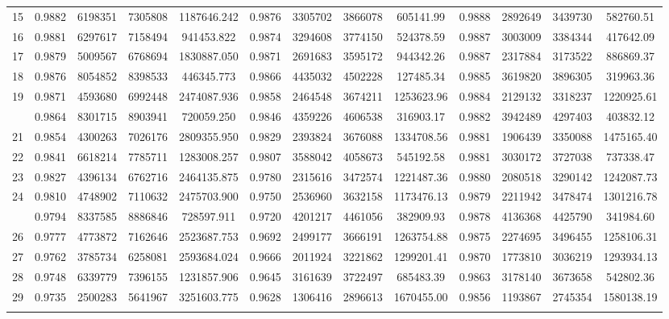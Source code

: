 \documentclass[
  12pt,
]{article}
\begin{document}
\begin{longtable}[t]{lcccccccccccc}
15 & 0.9882 & 6198351 & 7305808 & 1187646.242 & 0.9876 & 3305702 & 3866078 & 605141.99 & 0.9888 & 2892649 & 3439730 & 582760.51\\
16 & 0.9881 & 6297617 & 7158494 & 941453.822 & 0.9874 & 3294608 & 3774150 & 524378.59 & 0.9887 & 3003009 & 3384344 & 417642.09\\
17 & 0.9879 & 5009567 & 6768694 & 1830887.050 & 0.9871 & 2691683 & 3595172 & 944342.26 & 0.9887 & 2317884 & 3173522 & 886869.37\\
18 & 0.9876 & 8054852 & 8398533 & 446345.773 & 0.9866 & 4435032 & 4502228 & 127485.34 & 0.9885 & 3619820 & 3896305 & 319963.36\\
19 & 0.9871 & 4593680 & 6992448 & 2474087.936 & 0.9858 & 2464548 & 3674211 & 1253623.96 & 0.9884 & 2129132 & 3318237 & 1220925.61\\
\addlinespace
20 & 0.9864 & 8301715 & 8903941 & 720059.250 & 0.9846 & 4359226 & 4606538 & 316903.17 & 0.9882 & 3942489 & 4297403 & 403832.12\\
21 & 0.9854 & 4300263 & 7026176 & 2809355.950 & 0.9829 & 2393824 & 3676088 & 1334708.56 & 0.9881 & 1906439 & 3350088 & 1475165.40\\
22 & 0.9841 & 6618214 & 7785711 & 1283008.257 & 0.9807 & 3588042 & 4058673 & 545192.58 & 0.9881 & 3030172 & 3727038 & 737338.47\\
23 & 0.9827 & 4396134 & 6762716 & 2464135.875 & 0.9780 & 2315616 & 3472574 & 1221487.36 & 0.9880 & 2080518 & 3290142 & 1242087.73\\
24 & 0.9810 & 4748902 & 7110632 & 2475703.900 & 0.9750 & 2536960 & 3632158 & 1173476.13 & 0.9879 & 2211942 & 3478474 & 1301216.78\\
\addlinespace
25 & 0.9794 & 8337585 & 8886846 & 728597.911 & 0.9720 & 4201217 & 4461056 & 382909.93 & 0.9878 & 4136368 & 4425790 & 341984.60\\
26 & 0.9777 & 4773872 & 7162646 & 2523687.753 & 0.9692 & 2499177 & 3666191 & 1263754.88 & 0.9875 & 2274695 & 3496455 & 1258106.31\\
27 & 0.9762 & 3785734 & 6258081 & 2593684.024 & 0.9666 & 2011924 & 3221862 & 1299201.41 & 0.9870 & 1773810 & 3036219 & 1293934.13\\
28 & 0.9748 & 6339779 & 7396155 & 1231857.906 & 0.9645 & 3161639 & 3722497 & 685483.39 & 0.9863 & 3178140 & 3673658 & 542802.36\\
29 & 0.9735 & 2500283 & 5641967 & 3251603.775 & 0.9628 & 1306416 & 2896613 & 1670455.00 & 0.9856 & 1193867 & 2745354 & 1580138.19\\
\addlinespace

\end{longtable}
\end{document}
